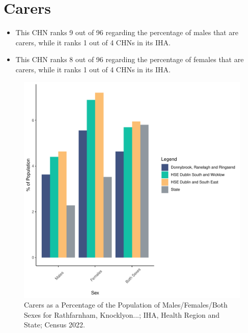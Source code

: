 \documentclass{article}
\begin{document}
\section{Carers}\label{sect:Carers}
\begin{itemize}
\item This CHN ranks  9 out of 96 regarding the percentage of males that are carers, while it ranks   1 out of 4 CHNs in its IHA.
\item This CHN ranks  8 out of 96 regarding the percentage of females that are carers, while it ranks   1 out of 4 CHNs in its IHA.
\end{itemize}
\begin{figure}[H]
	\centering
	\includegraphics[width = 150mm]{../figures/CareED.pdf}
	\caption{Carers as a Percentage of the Population of Males/Females/Both Sexes for Rathfarnham, Knocklyon...; IHA, Health Region and State; Census 2022.}
	\label{fig:2ae19629-1a6a-13a3-e055-000000000001}
	\end{figure}
\end{document}
